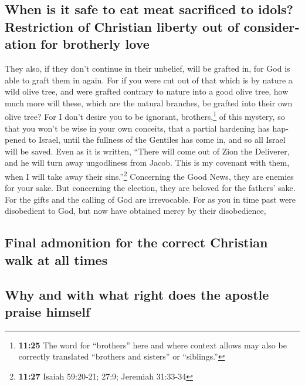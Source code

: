 \begin{paracol}{2}
\begin{otherlanguage}{english}
\hypertarget{when-is-it-safe-to-eat-meat-sacrificed-to-idols-restriction-of-christian-liberty-out-of-consideration-for-brotherly-love}{%
\subsection{When is it safe to eat meat sacrificed to idols? Restriction
of Christian liberty out of consideration for brotherly
love}\label{when-is-it-safe-to-eat-meat-sacrificed-to-idols-restriction-of-christian-liberty-out-of-consideration-for-brotherly-love}}

 They also, if they don't continue in their unbelief,
will be grafted in, for God is able to graft them in again.
 For if you were cut out of that which is by nature a
wild olive tree, and were grafted contrary to nature into a good olive
tree, how much more will these, which are the natural branches, be
grafted into their own olive tree?  For I don't desire
you to be ignorant, brothers,\footnote{\textbf{11:25} The word for
  ``brothers'' here and where context allows may also be correctly
  translated ``brothers and sisters'' or ``siblings.''} of this mystery,
so that you won't be wise in your own conceits, that a partial hardening
has happened to Israel, until the fullness of the Gentiles has come in,
 and so all Israel will be saved. Even as it is written,
``There will come out of Zion the Deliverer, and he will turn away
ungodliness from Jacob.  This is my covenant with them,
when I will take away their sins.''\footnote{\textbf{11:27} Isaiah
  59:20-21; 27:9; Jeremiah 31:33-34}  Concerning the Good
News, they are enemies for your sake. But concerning the election, they
are beloved for the fathers' sake.  For the gifts and the
calling of God are irrevocable.  For as you in time past
were disobedient to God, but now have obtained mercy by their
disobedience,

\hypertarget{final-admonition-for-the-correct-christian-walk-at-all-times}{%
\subsection{Final admonition for the correct Christian walk at all
times}\label{final-admonition-for-the-correct-christian-walk-at-all-times}}

\hypertarget{why-and-with-what-right-does-the-apostle-praise-himself}{%
\subsection{Why and with what right does the apostle praise
himself}\label{why-and-with-what-right-does-the-apostle-praise-himself}}


\end{otherlanguage}
\end{paracol}
